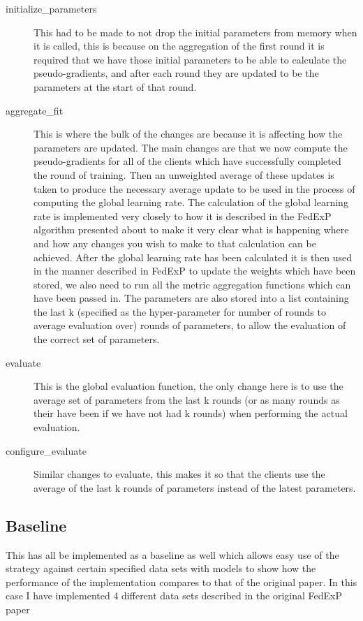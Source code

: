 \documentclass{article}
\begin{document}
\begin{description}
    \item[initialize\_parameters]{This had to be made to not drop the initial parameters from memory when it is called, this is because on the aggregation of the first round it is required that we have those initial parameters to be able to calculate the pseudo-gradients, and after each round they are updated to be the parameters at the start of that round.}
    \item[aggregate\_fit]{This is where the bulk of the changes are because it is affecting how the parameters are updated.  The main changes are that we now compute the pseudo-gradients for all of the clients which have successfully completed the round of training.  Then an unweighted average of these updates is taken to produce the necessary average update to be used in the process of computing the global learning rate.  The calculation of the global learning rate is implemented very closely to how it is described in the FedExP algorithm presented about to make it very clear what is happening where and how any changes you wish to make to that calculation can be achieved.  After the global learning rate has been calculated it is then used in the manner described in FedExP to update the weights which have been stored, we also need to run all the metric aggregation functions which can have been passed in.  The parameters are also stored into a list containing the last k (specified as the hyper-parameter for number of rounds to average evaluation over) rounds of parameters, to allow the evaluation of the correct set of parameters.}
    \item[evaluate]{This is the global evaluation function, the only change here is to use the average set of parameters from the last k rounds (or as many rounds as their have been if we have not had k rounds) when performing the actual evaluation.}
    \item[configure\_evaluate]{Similar changes to evaluate, this makes it so that the clients use the average of the last k rounds of parameters instead of the latest parameters.}
\end{description}

\subsection{Baseline}

This has all be implemented as a baseline as well which allows easy use of the strategy against certain specified data sets with models to show how the performance of the implementation compares to that of the original paper.  In this case I have implemented 4 different data sets described in the original FedExP paper
\end{document}
